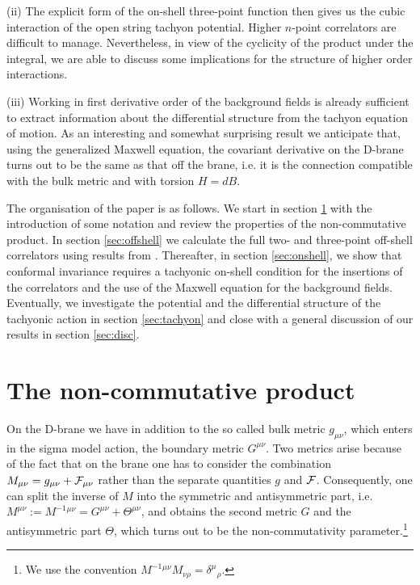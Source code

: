 \documentclass[a4paper,11pt]{article}               \def\new#1\endnew{{\bf #1}}
\newcommand {\cF} {{\cal F}}
\begin{document}
(ii) The explicit form of the on-shell three-point function then gives 
us the cubic interaction of the open string tachyon potential. 
Higher $n$-point correlators are difficult to manage. Nevertheless, 
in view of the cyclicity of the product under the integral, we are able to 
discuss some implications for the structure of higher order 
interactions.

(iii) Working in first derivative order of the background fields is
already sufficient to extract information about the differential structure 
from the tachyon equation of motion. As an interesting and somewhat 
surprising result we anticipate that, using the generalized Maxwell equation, 
the covariant derivative on the D-brane turns out to be the same as that off 
the brane, i.e. it is the connection compatible with the bulk metric and 
with torsion $H=dB$.

The organisation of the paper is as follows.
We start in section \ref{sec:NCP} with the introduction of some notation 
and review the properties of the non-commutative product. In
section \ref{sec:offshell} we calculate the full two- and three-point
off-shell correlators using results from
\cite{Herbst:2001ai}. Thereafter, in section \ref{sec:onshell}, we show
that conformal invariance requires a tachyonic on-shell condition for
the insertions of the correlators and the use of the Maxwell equation for 
the background fields. Eventually, we investigate the potential and the 
differential structure of the tachyonic action in section \ref{sec:tachyon} 
and close with a general discussion of our results in section \ref{sec:disc}.


\section{The non-commutative product}
\label{sec:NCP}


On the D-brane we have in addition to the so called bulk metric 
$g_{\mu\nu}$, which enters in the sigma model action, the
boundary metric $G^{\mu\nu}$. Two metrics arise because of the fact that
on the brane one has to consider the combination
$M_{\mu\nu} = g_{\mu\nu} + \cF_{\mu\nu}$ rather than the separate
quantities $g$ and $\cF$. Consequently, one can split the inverse of $M$
into the symmetric and antisymmetric part, i.e. 
$M^{\mu\nu} := M^{-1}{}^{\mu\nu} = G^{\mu\nu} + \Theta^{\mu\nu}$, and obtains
the second metric $G$ and the antisymmetric part $\Theta$, which turns out
to be the non-commutativity parameter.\footnote{%
  We use the convention $M^{-1}{}^{\mu\nu} M_{\nu\rho} = \delta^\mu{}_\rho$.
}
\end{document}
